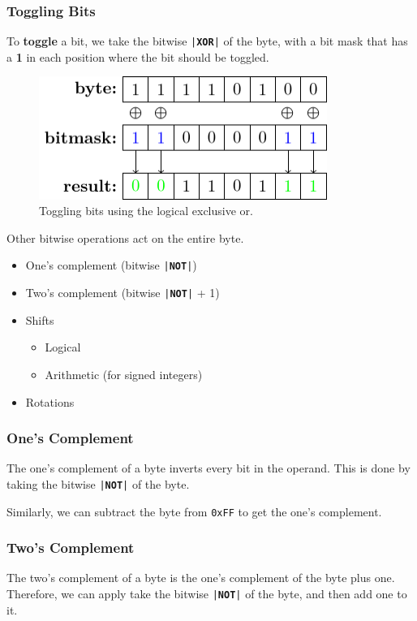 \documentclass{article}
\newcommand{\keyword}[1]{\textcolor[rgb]{0.00,0.50,0.00}{\textbf{#1}}}
\begin{document}
\subsubsection{Toggling Bits}
To \textbf{toggle} a bit, we take the bitwise \texttt{|\keyword{XOR}|} of the byte, with a bit mask
that has a \textbf{1} in each position where the bit should be toggled.
\begin{figure}[H]
    \centering
    \includegraphics[height = 4cm, keepaspectratio = true]{figures/bit_toggle.pdf}
    \caption{Toggling bits using the logical exclusive or.} %
\end{figure}
Other bitwise operations act on the entire byte.
\begin{itemize}
    \item One's complement (bitwise \texttt{|\keyword{NOT}|})
    \item Two's complement (bitwise \texttt{|\keyword{NOT}|} + 1)
    \item Shifts
          \begin{itemize}
              \item Logical
              \item Arithmetic (for signed integers)
          \end{itemize}
    \item Rotations
\end{itemize}
\subsubsection{One's Complement}
The one's complement of a byte inverts every bit in the operand. This is done by
taking the bitwise \texttt{|\keyword{NOT}|} of the byte.

Similarly, we can subtract the byte from \texttt{0xFF} to get the one's complement.
\subsubsection{Two's Complement}
The two's complement of a byte is the one's complement of the byte plus one.
Therefore, we can apply take the bitwise \texttt{|\keyword{NOT}|} of the byte, and then add one to it.
\end{document}
